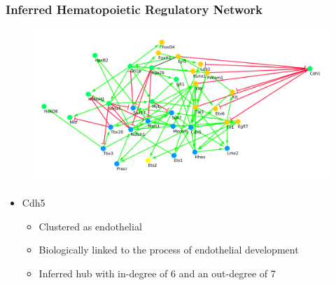 \documentclass[14pt,aspectratio=169]{beamer}
\begin{document}
\begin{frame}
\frametitle{Inferred Hematopoietic Regulatory Network}

\begin{figure}
	\includegraphics*[height = 0.55\textheight]{../Datasets/miic-trimmed/miic-trimmed.png}
\end{figure}
\begin{itemize}
\item Cdh5
	\begin{itemize}
	\item Clustered as endothelial
	\item Biologically linked to the process of endothelial development
	\item Inferred hub with in-degree of 6 and an out-degree of 7
	\end{itemize}
\end{itemize}
\end{frame}
\end{document}
